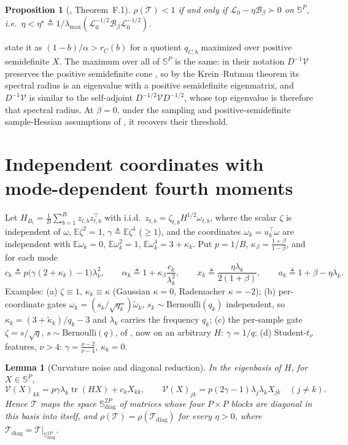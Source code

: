 \documentclass[11pt]{article}
\newtheorem{proposition}[theorem]{Proposition}
\newtheorem{lemma}[theorem]{Lemma}
\theoremstyle{remark}
\newcommand{\E}{\mathbb{E}}
\newcommand{\tr}{\operatorname{tr}}
\newcommand{\T}{\mathcal T}
\newcommand{\V}{\mathcal V}
\begin{document}
\begin{proposition}[\citealp{cai2026llm}, Theorem~F.1]\label{prop:cai}
$\rho(\T)<1$ if and only if $\mathcal L_0-\eta\mathcal B_\beta\succ0$ on $\mathbb S^P$, i.e.\ $\eta<\eta^\star\triangleq1/\lambda_{\max}(\mathcal L_0^{-1/2}\mathcal B_\beta\mathcal L_0^{-1/2})$.
\end{proposition}
\citet{cai2026llm} state it as $(1-b)/\alpha>r_C(b)$ for a quotient $q_{C,b}$ maximized over positive semidefinite $X$. The maximum over all of $\mathbb S^P$ is the same: in their notation $D^{-1}\V$ preserves the positive semidefinite cone \citep[Lemma~F.13]{cai2026llm}, so by the Krein--Rutman theorem its spectral radius is an eigenvalue with a positive semidefinite eigenmatrix, and $D^{-1}\V$ is similar to the self-adjoint $D^{-1/2}\V D^{-1/2}$, whose top eigenvalue is therefore that spectral radius. At $\beta=0$, under the sampling and positive-semidefinite sample-Hessian assumptions of \citet[Theorem~5]{mulayoff2024exact}, it recovers their threshold.

\section{Independent coordinates with mode-dependent fourth moments}\label{sec:rf}

Let $H_{B_t}=\frac1B\sum_{b=1}^Bz_{t,b}z_{t,b}^\top$ with i.i.d.\ $z_{t,b}=\zeta_{t,b}H^{1/2}\omega_{t,b}$, where the scalar $\zeta$ is independent of $\omega$, $\E\zeta^2=1$, $\gamma\triangleq\E\zeta^4$ ($\ge1$), and the coordinates $\omega_k=u_k^\top\omega$ are independent with $\E\omega_k=0$, $\E\omega_k^2=1$, $\E\omega_k^4=3+\kappa_k$. Put $p=1/B$, $\kappa_\beta=\frac{1+\beta}{1-\beta}$, and for each mode
\[
c_k\triangleq p\big(\gamma(2+\kappa_k)-1\big)\lambda_k^2,\qquad \alpha_k\triangleq1+\kappa_\beta\frac{c_k}{\lambda_k^2},\qquad x_k\triangleq\frac{\eta\lambda_k}{2(1+\beta)},\qquad a_k\triangleq1+\beta-\eta\lambda_k .
\]
Examples: (a) $\zeta\equiv1$, $\kappa_k\equiv\kappa$ (Gaussian $\kappa=0$, Rademacher $\kappa=-2$); (b) per-coordinate gates $\omega_k=(s_k/\sqrt{q_k})\tilde\omega_k$, $s_k\sim\mathrm{Bernoulli}(q_k)$ independent, so $\kappa_k=(3+\tilde\kappa_k)/q_k-3$ and $\lambda_k$ carries the frequency $q_k$; (c) the per-sample gate $\zeta=s/\sqrt q$, $s\sim\mathrm{Bernoulli}(q)$, of \citet{everett2026sparse}, now on an arbitrary $H$: $\gamma=1/q$; (d) Student-$t_\nu$ features, $\nu>4$: $\gamma=\frac{\nu-2}{\nu-4}$, $\kappa_k=0$.

\begin{lemma}[Curvature noise and diagonal reduction]\label{lem:V}
In the eigenbasis of $H$, for $X\in\mathbb S^P$,
\[
\V(X)_{kk}=p\gamma\lambda_k\tr(HX)+c_kX_{kk},\qquad \V(X)_{jk}=p(2\gamma-1)\lambda_j\lambda_kX_{jk}\quad(j\ne k).
\]
Hence $\T$ maps the space $\mathbb S^{2P}_{\mathrm{diag}}$ of matrices whose four $P\times P$ blocks are diagonal in this basis into itself, and $\rho(\T)=\rho(\T_{\mathrm{diag}})$ for every $\eta>0$, where $\T_{\mathrm{diag}}=\T|_{\mathbb S^{2P}_{\mathrm{diag}}}$.
\end{lemma}
\end{document}
